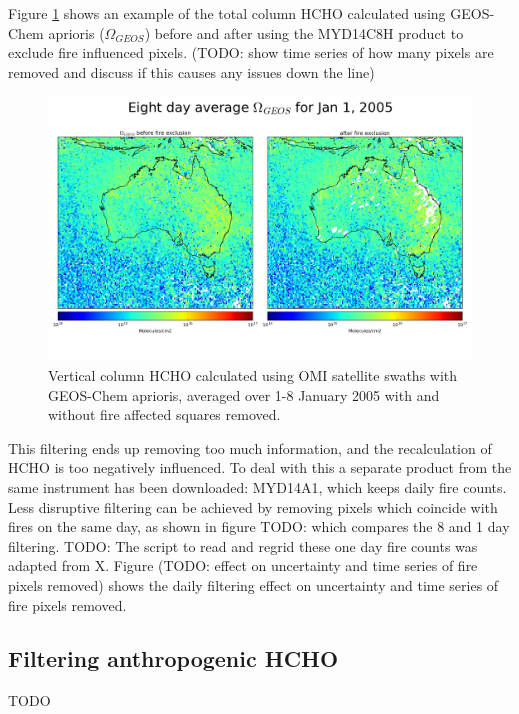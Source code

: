     Figure \ref{ch_HCHO:fig:fireexclusionexample} shows an example of the total column HCHO calculated using GEOS-Chem aprioris ($\Omega_{GEOS}$) before and after using the MYD14C8H product to exclude fire influenced pixels.
    (TODO: show time series of how many pixels are removed and discuss if this causes any issues down the line)
    
    \begin{figure}[!htbp]\begin{center}
      \includegraphics[width=\textwidth]{Figures/HCHO/fire_exclusion_aus_8d.png}
      \caption{Vertical column HCHO calculated using OMI satellite swaths with GEOS-Chem aprioris, averaged over 1-8 January 2005 with and without fire affected squares removed.}
      \label{ch_HCHO:fig:fireexclusionexample}
    \end{center}\end{figure}
    
    This filtering ends up removing too much information, and the recalculation of HCHO is too negatively influenced.
    To deal with this a separate product from the same instrument has been downloaded: MYD14A1, which keeps daily fire counts.
    Less disruptive filtering can be achieved by removing pixels which coincide with fires on the same day, as shown in figure TODO: which compares the 8 and 1 day filtering.
    TODO: The script to read and regrid these one day fire counts was adapted from X.
    Figure (TODO: effect on uncertainty and time series of fire pixels removed) shows the daily filtering effect on uncertainty and time series of fire pixels removed.
    
  \subsection{Filtering anthropogenic HCHO}
    TODO
  
